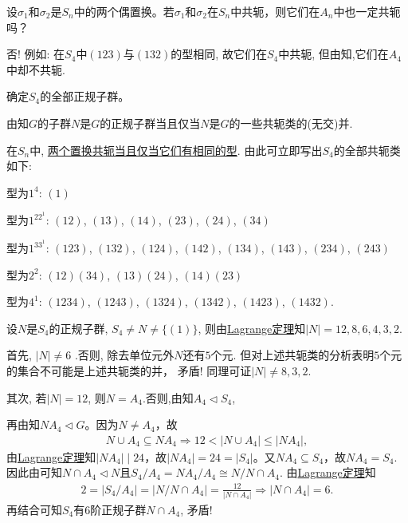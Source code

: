 \documentclass[../../main.tex]{subfiles}%
\begin{document}
\begin{example}
设$\sigma_1$和$\sigma_2$是$S_n$中的两个偶置换。若$\sigma_1$和$\sigma_2$在$S_n$中共轭，则它们在$A_n$中也一定共轭吗？
\end{example}
\begin{solution}

否! 例如: 在$S_4$中$(123)$与$(132)$的型相同, 故它们在$S_4$中共轭, 但由知,它们在$A_4$中却不共轭.

\end{solution}

\begin{example}
确定$S_4$的全部正规子群。
\end{example}
\begin{solution}

由知$G$的子群$N$是$G$的正规子群当且仅当$N$是$G$的一些共轭类的(无交)并.

在$S_n$中, \hyperref[theorem:对称群中置换共轭等价于型相同]{两个置换共轭当且仅当它们有相同的型}. 由此可立即写出$S_4$的全部共轭类如下:

型为$1^4$: $(1)$

型为$1^22^1$: $(12)$, $(13)$, $(14)$, $(23)$, $(24)$, $(34)$

型为$1^33^1$: $(123)$, $(132)$, $(124)$, $(142)$, $(134)$, $(143)$, $(234)$, $(243)$

型为$2^2$: $(12)(34)$, $(13)(24)$, $(14)(23)$

型为$4^1$: $(1234)$, $(1243)$, $(1324)$, $(1342)$, $(1423)$, $(1432)$.

设$N$是$S_4$的正规子群, $S_4 \neq N \neq \{(1)\}$, 则由\hyperref[theorem:抽象代数--Lagrange定理]{Lagrange定理}知$|N| = 12, 8, 6, 4, 3, 2$.

首先, $|N| \neq 6$ .否则, 除去单位元外$N$还有$5$个元. 但对上述共轭类的分析表明$5$个元的集合不可能是上述共轭类的并， 矛盾! 同理可证$|N| \neq 8, 3, 2$.

其次, 若$|N| = 12$, 则$N = A_4$.否则,由知$A_4\lhd S_4$,

再由知$NA_4\lhd G$。因为$N\neq A_4$，故\begin{align*}
N\cup A_4\subseteq NA_4\Longrightarrow 12<\left| N\cup A_4 \right|\leqslant \left| NA_4 \right|,
\end{align*}
由\hyperref[theorem:抽象代数--Lagrange定理]{Lagrange定理}知$\left| NA_4 \right|\mid 24$，故$\left| NA_4 \right|=24=\left| S_4 \right|$。又$NA_4\subseteq S_4$，故$NA_4=S_4$.
因此由可知$N\cap A_4\lhd N$且$S_4/A_4 = NA_4/A_4 \cong N/N \cap A_4$. 由\hyperref[theorem:抽象代数--Lagrange定理]{Lagrange定理}知
\begin{align*}
2=|S_4/A_4|=|N/N\cap A_4|=\frac{12}{|N\cap A_4|}\Longrightarrow |N\cap A_4| = 6.
\end{align*}
再结合可知$S_4$有$6$阶正规子群$N \cap A_4$, 矛盾!


\end{solution}
\end{document}
